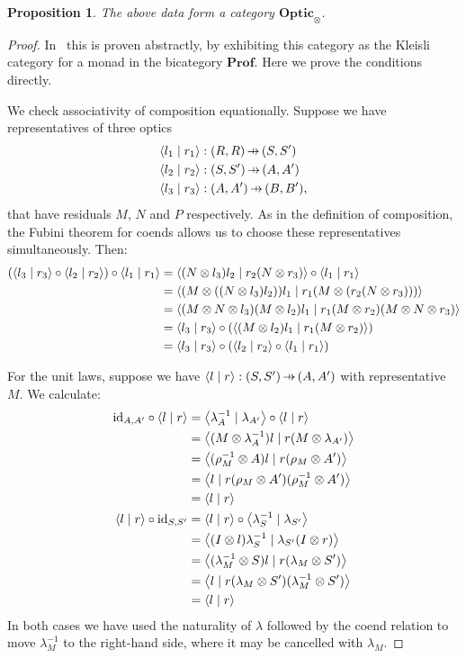 \documentclass[11pt,letterpaper]{article}
\theoremstyle{plain}
\newtheorem{proposition}[theorem]{Proposition}
\theoremstyle{definition}
\newcommand{\Prof}{\mathbf{Prof}}
\newcommand{\Optic}{\mathbf{Optic}}
\newcommand{\id}{\mathrm{id}}
\newcommand{\rep}[2]{{\ensuremath \left\langle #1 \mid #2 \right\rangle}}
\newcommand{\hto}{\ensuremath{\,\mathaccent\shortmid\rightarrow\,}}
\begin{document}
\begin{proposition}\label{prop:optic-is-cat}
  The above data form a category $\Optic_\otimes$.
\end{proposition}
\begin{proof}
  In~\cite[Section 6]{Doubles} this is proven abstractly, by exhibiting this category as the Kleisli category for a monad in the bicategory $\Prof$. Here we prove the conditions directly.

  We check associativity of composition equationally.  Suppose we have representatives of three optics
\begin{align*}
  \rep{l_1}{r_1} &: (R, R) \hto (S, S') \\
  \rep{l_2}{r_2} &: (S, S') \hto (A, A') \\
  \rep{l_3}{r_3} &: (A, A') \hto (B, B'),
\end{align*}
that have residuals $M$, $N$ and $P$ respectively. As in the definition of composition, the Fubini theorem for coends allows us to choose these representatives simultaneously. Then:
  \begin{align*}
    (\rep{l_3}{r_3} \circ \rep{l_2}{r_2}) \circ \rep{l_1}{r_1}
    &= \rep{(N \otimes l_3)l_2}{r_2(N \otimes r_3)} \circ \rep{l_1}{r_1} \\
    &= \rep{(M \otimes ((N \otimes l_3)l_2))l_1}{r_1(M \otimes (r_2(N \otimes r_3)))} \\
    &= \rep{(M \otimes N \otimes l_3)(M \otimes l_2)l_1}{r_1(M \otimes r_2)(M \otimes N \otimes r_3)} \\
    &= \rep{l_3}{r_3} \circ (\rep{(M \otimes l_2)l_1}{r_1(M \otimes r_2)}) \\
    &= \rep{l_3}{r_3} \circ (\rep{l_2}{r_2} \circ \rep{l_1}{r_1})
  \end{align*}

  For the unit laws, suppose we have $\rep{l}{r} : (S, S') \hto (A, A')$ with representative $M$. We calculate:
  \begin{align*}
    \id_{A, A'} \circ \rep{l}{r}
    &= \rep{\lambda^{-1}_A}{\lambda_{A'}} \circ \rep{l}{r} \\
    &= \rep{(M \otimes \lambda^{-1}_A) l}{r (M \otimes  \lambda_{A'})} \\
    &= \rep{(\rho^{-1}_M \otimes  A) l}{r (\rho_M \otimes A')} \\
    &= \rep{l}{r (\rho_M \otimes A') (\rho^{-1}_M \otimes A')} \\
    &= \rep{l}{r} \\
    \rep{l}{r} \circ \id_{S, S'}
    &= \rep{l}{r} \circ \rep{\lambda^{-1}_S}{\lambda_{S'}}  \\
    &= \rep{(I \otimes l)\lambda^{-1}_S}{\lambda_{S'} (I \otimes r)} \\
    &= \rep{(\lambda^{-1}_M \otimes S)l}{r (\lambda_{M} \otimes S')} \\
    &= \rep{l}{r (\lambda_{M} \otimes S')(\lambda^{-1}_M \otimes S')} \\
    &= \rep{l}{r}
  \end{align*}
  In both cases we have used the naturality of $\lambda$ followed by the coend relation to move $\lambda^{-1}_M$ to the right-hand side, where it may be cancelled with $\lambda_M$.
\end{proof}
\end{document}
